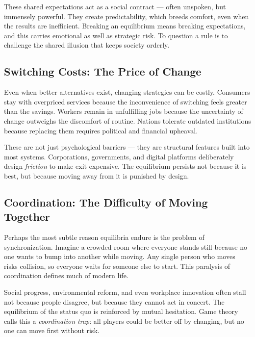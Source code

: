 \documentclass[12pt,twoside]{book}
\begin{document}
These shared expectations act as a social contract — often unspoken, but immensely powerful.  
They create predictability, which breeds comfort, even when the results are inefficient.  
Breaking an equilibrium means breaking expectations, and this carries emotional as well as strategic risk.  
To question a rule is to challenge the shared illusion that keeps society orderly.

\subsection*{Switching Costs: The Price of Change}
Even when better alternatives exist, changing strategies can be costly.  
Consumers stay with overpriced services because the inconvenience of switching feels greater than the savings.  
Workers remain in unfulfilling jobs because the uncertainty of change outweighs the discomfort of routine.  
Nations tolerate outdated institutions because replacing them requires political and financial upheaval.  

These are not just psychological barriers — they are structural features built into most systems.  
Corporations, governments, and digital platforms deliberately design \emph{friction} to make exit expensive.  
The equilibrium persists not because it is best, but because moving away from it is punished by design.

\subsection*{Coordination: The Difficulty of Moving Together}
Perhaps the most subtle reason equilibria endure is the problem of synchronization.  
Imagine a crowded room where everyone stands still because no one wants to bump into another while moving.  
Any single person who moves risks collision, so everyone waits for someone else to start.  
This paralysis of coordination defines much of modern life.  

Social progress, environmental reform, and even workplace innovation often stall not because people disagree, but because they cannot act in concert.  
The equilibrium of the status quo is reinforced by mutual hesitation.  
Game theory calls this a \emph{coordination trap}: all players could be better off by changing, but no one can move first without risk. \\ 
\end{document}
